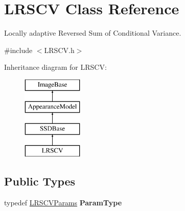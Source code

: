 \hypertarget{classLRSCV}{\section{L\-R\-S\-C\-V Class Reference}
\label{classLRSCV}
}


Locally adaptive Reversed Sum of Conditional Variance.  




{\ttfamily \#include $<$L\-R\-S\-C\-V.\-h$>$}

Inheritance diagram for L\-R\-S\-C\-V\-:\begin{figure}[H]
\begin{center}
\leavevmode
\includegraphics[height=4.000000cm]{classLRSCV}
\end{center}
\end{figure}
\subsection*{Public Types}
\begin{DoxyCompactItemize}
\item 
\hypertarget{classLRSCV_ae98628f9d147084d85763a1c16a6400b}{typedef \hyperlink{structLRSCVParams}{L\-R\-S\-C\-V\-Params} {\bfseries Param\-Type}}\label{classLRSCV_ae98628f9d147084d85763a1c16a6400b}

\end{DoxyCompactItemize}
